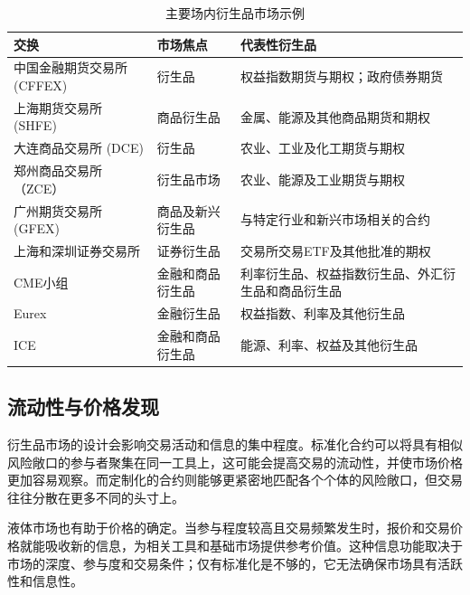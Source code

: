 \begin{table}[H]
\centering
\caption{主要场内衍生品市场示例}
\label{tab:ch11-major-derivative-exchanges}

\begin{tabularx}{\textwidth}{p{3.8cm} p{3.2cm} X}
\toprule
\textbf{交换} &
\textbf{市场焦点} &
\textbf{代表性衍生品} \\
\midrule

中国金融期货交易所 (CFFEX) & 衍生品 & 权益指数期货与期权；政府债券期货 \\

上海期货交易所 (SHFE) &  
商品衍生品 &  
金属、能源及其他商品期货和期权 \\

大连商品交易所 (DCE) & 
衍生品 & 
农业、工业及化工期货与期权 \\

郑州商品交易所（ZCE） &
衍生品市场 &
农业、能源及工业期货与期权 \\

广州期货交易所 (GFEX) &  
商品及新兴衍生品 &  
与特定行业和新兴市场相关的合约 \\

上海和深圳证券交易所 & 
证券衍生品 & 
交易所交易ETF及其他批准的期权 \\

\addlinespace
CME小组 &
金融和商品衍生品 &
利率衍生品、权益指数衍生品、外汇衍生品和商品衍生品 \\

Eurex &
金融衍生品 &
权益指数、利率及其他衍生品 \\

ICE &
金融和商品衍生品 &
能源、利率、权益及其他衍生品 \\

\bottomrule
\end{tabularx}
\end{table}

\subsection{流动性与价格发现}

衍生品市场的设计会影响交易活动和信息的集中程度。标准化合约可以将具有相似风险敞口的参与者聚集在同一工具上，这可能会提高交易的流动性，并使市场价格更加容易观察。而定制化的合约则能够更紧密地匹配各个个体的风险敞口，但交易往往分散在更多不同的头寸上。

液体市场也有助于价格的确定。当参与程度较高且交易频繁发生时，报价和交易价格就能吸收新的信息，为相关工具和基础市场提供参考价值。这种信息功能取决于市场的深度、参与度和交易条件；仅有标准化是不够的，它无法确保市场具有活跃性和信息性。


